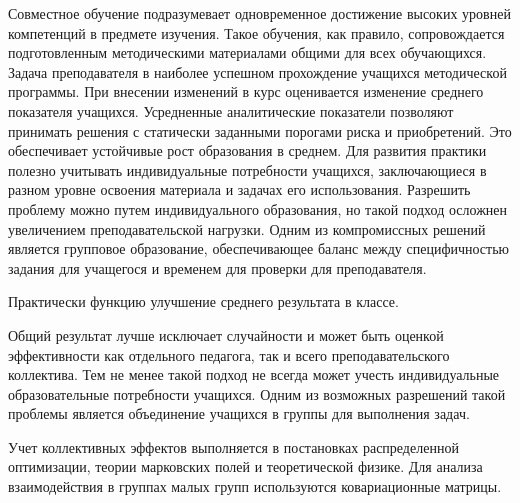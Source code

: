 Совместное обучение подразумевает одновременное достижение высоких уровней компетенций в предмете изучения.
Такое обучения, как правило, сопровождается подготовленным методическими материалами общими для всех обучающихся.
Задача преподавателя в наиболее успешном прохождение учащихся методической программы. При внесении изменений
в курс оценивается изменение среднего показателя учащихся. Усредненные аналитические показатели позволяют принимать решения с статически заданными
порогами риска и приобретений. Это обеспечивает устойчивые рост образования в среднем. Для развития практики
полезно учитывать индивидуальные потребности учащихся, заключающиеся в разном уровне освоения материала и задачах его использования. Разрешить проблему
можно путем индивидуального образования, но такой подход осложнен увеличением преподавательской нагрузки. Одним из компромиссных решений является групповое образование,
обеспечивающее баланс между специфичностью задания для учащегося и временем для проверки для преподавателя.


Практически функцию улучшение среднего результата в классе. 



Общий результат лучше исключает
случайности и может быть оценкой эффективности как отдельного педагога, так и всего преподавательского коллектива.
Тем не менее такой подход не всегда может учесть индивидуальные образовательные потребности учащихся. Одним из возможных
разрешений такой проблемы является объединение учащихся в группы для выполнения задач.

Учет коллективных эффектов
выполняется в постановках распределенной оптимизации, теории марковских полей и теоретической физике. Для анализа взаимодействия в группах малых групп используются 
ковариационные матрицы. 
